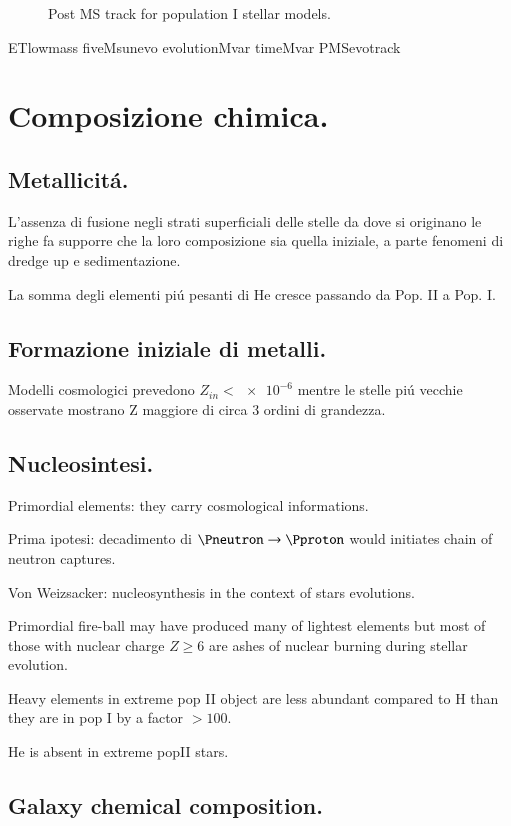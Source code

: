 \begin{figure}[!ht]
\centering
\caption{Post MS track for population I stellar models.}
\end{figure}
ETlowmass
fiveMsunevo
evolutionMvar
timeMvar
PMSevotrack
\clearpage

\section{Composizione chimica.}

\subsection{Metallicit\'a.}
L'assenza di fusione negli strati superficiali delle stelle da dove si originano le righe fa supporre  che la loro composizione sia quella iniziale, a parte fenomeni di dredge up e sedimentazione.

La somma degli elementi pi\'u pesanti di He cresce passando da Pop. II a Pop. I.

\subsection{Formazione iniziale di metalli.}

Modelli cosmologici prevedono $Z_{in}<\num{e-6}$ mentre le stelle pi\'u vecchie osservate mostrano Z maggiore di circa 3 ordini di grandezza.

\subsection{Nucleosintesi.}
Primordial elements: they carry cosmological informations.

Prima ipotesi: decadimento di $\Pneutron\to\Pproton$ would initiates chain of neutron captures.

Von Weizsacker: nucleosynthesis in the context of stars evolutions.

Primordial fire-ball may have produced many of lightest elements but most of those with nuclear charge $Z\geq6$ are ashes of nuclear burning during stellar evolution.

Heavy elements in extreme pop II object are less abundant compared to H than they are in pop I by a factor $>100$.

He is absent in extreme popII stars.

\subsection{Galaxy chemical composition.}

